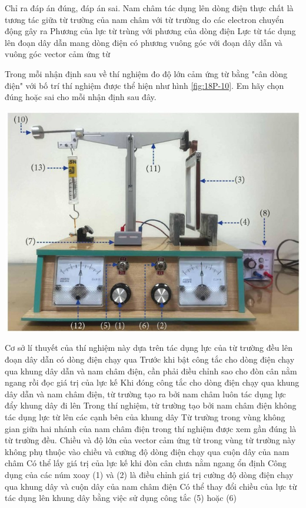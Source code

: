 \begin{ex}
	Chỉ ra đáp án đúng, đáp án sai.
	{Nam châm tác dụng lên dòng điện thực chất là tương tác giữa từ trường của nam châm với từ trường do các electron chuyển động gây ra}
	{Phương của lực từ trùng với phương của dòng điện}
	{\True Lực từ tác dụng lên đoạn dây dẫn mang dòng điện có phương vuông góc với đoạn dây dẫn và vuông góc vector cảm ứng từ}
	\loigiai{}
\end{ex}
\begin{ex}
	Trong mỗi nhận định sau về thí nghiệm đo độ lớn cảm ứng từ bằng "cân dòng điện" với bố trí thí nghiệm được thể hiện như hình \ref{fig:18P-10}. Em hãy chọn đúng hoặc sai cho mỗi nhận định sau đây.
	\begin{center}
		\includegraphics[width=0.55\linewidth]{figs/VN12-Y24-PH-SYL-018P-10}
		\label{fig:18P-10}
	\end{center}
	\choiceTFt
	{\True Cơ sở lí thuyết của thí nghiệm này dựa trên tác dụng lực của từ trường đều lên đoạn dây dẫn có dòng điện chạy qua}
	{\True Trước khi bật công tắc cho dòng điện chạy qua khung dây dẫn và nam châm điện, cần phải điều chỉnh sao cho đòn cân nằm ngang rồi đọc giá trị của lực kế}
	{Khi đóng công tắc cho dòng điện chạy qua khung dây dẫn và nam châm điện, từ trường tạo ra bởi nam châm luôn tác dụng lực đẩy khung dây đi lên}
	{\True Trong thí nghiệm, từ trường tạo bởi nam châm điện không tác dụng lực từ lên các cạnh bên của khung dây}
	{Từ trường trong vùng không gian giữa hai nhánh của nam châm điện trong thí nghiệm được xem gần đúng là từ trường đều. Chiều và độ lớn của vector cảm ứng từ trong vùng từ trường này không phụ thuộc vào chiều và cường độ dòng điện chạy qua cuộn dây của nam châm}
	{Có thể lấy giá trị của lực kế khi đòn cân chưa nằm ngang ổn định}
	{\True Công dụng của các núm xoay (1) và (2) là điều chỉnh giá trị cường độ dòng điện chạy qua khung dây và cuộn dây của nam châm điện}
	{\True Có thể thay đổi chiều của lực từ tác dụng lên khung dây bằng việc sử dụng công tắc (5) hoặc (6)}
	\loigiai{}
\end{ex}

